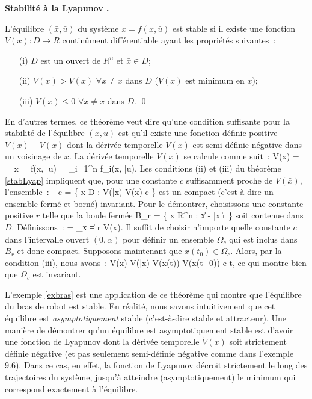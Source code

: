 \begin{theoreme}\label{stabLyap}{\bf Stabilité \og à la Lyapunov \fg.}

L'équilibre $(\bar x, \bar u)$ du système $\dot x = f(x,\bar u)$ est stable si il existe une fonction $V(x): D \rightarrow R$ contin\^ument différentiable ayant les propriétés suivantes~:\\
\begin{itemize}
\item[(i)] $D$ est un ouvert de $R^n$ et $\bar x \in D$;\\
\item[(ii)] $V(x) > V(\bar x)$ $\forall x \neq \bar x$ dans $D$ ($V(x)$ est minimum en $\bar x$);\\
\item[(iii)] $\dot V(x) \leq 0$ $\forall x \neq \bar x$ dans $D$. \qed
\end{itemize}
\end{theoreme}
En d'autres termes, ce théorème veut dire qu'une condition suffisante pour la stabilité de l'équilibre $(\bar x, \bar u)$ est qu'il existe une fonction définie positive $V(x) - V(\bar x)$ dont la dérivée temporelle $\dot V(x)$ est semi-définie négative dans un voisinage de $\bar x$. La dérivée temporelle $\dot V(x)$ se calcule comme suit~:
\eqnn
\dot V(x) =  =  \dot x =  f(x, \bar u) = \sum_{i=1}^n  f_i(x, \bar u).
\eeqnn
Les conditions (ii) et (iii) du théorème \ref{stabLyap} impliquent que, pour une constante $c$ suffisamment proche de $V(\bar x)$, l'ensemble~:
\eqnn
\Omega_c = \{ x \in D : V(\bar x) \leq V(x) \leq c \}
\eeqnn
est un compact (c'est-à-dire un ensemble fermé et borné) invariant. Pour le démontrer, 
choisissons une constante positive $r$ telle que la boule fermée
\eqnn
B_r = \{ x \in R^n :  \| x - \bar x \| \leq r \}
\eeqnn
soit contenue dans $D$. Définissons~:
\eqnn
\alpha = \min_{\| x \| = r} V(x).
\eeqnn
Il suffit de choisir n'importe quelle constante $c$ dans l'intervalle ouvert $(0,\alpha)$ pour définir un ensemble $\Omega_c$ qui est inclus dans $B_r$ et donc compact. Supposons maintenant que $x(t_0) \in \Omega_c$. Alors, par la condition (iii), nous avons~:
\eqnn
\dot V(x)  \;\;\; \Rightarrow \;\;\; V(\bar x) \leq V(x(t)) \leq V(x(t_0)) \leq c \;\;\; \forall t,
\eeqnn
ce qui montre bien que $\Omega_c$ est invariant.

L'exemple \ref{exbras} est une application de ce théorème qui montre que l'équilibre du bras de robot est stable. En réalité, nous savons intuitivement que cet équilibre est {\em asymptotiquement} stable (c'est-à-dire stable et attracteur). Une manière de démontrer qu'un équilibre est asymptotiquement stable est d'avoir une fonction de Lyapunov dont la dérivée temporelle $ \dot V(x)$ soit strictement  définie négative (et pas seulement semi-définie négative comme dans l'exemple 9.6). Dans ce cas, en effet, la fonction de Lyapunov décroit strictement le long des trajectoires du système, jusqu'à atteindre (asymptotiquement) le minimum qui correspond exactement à l'équilibre.

